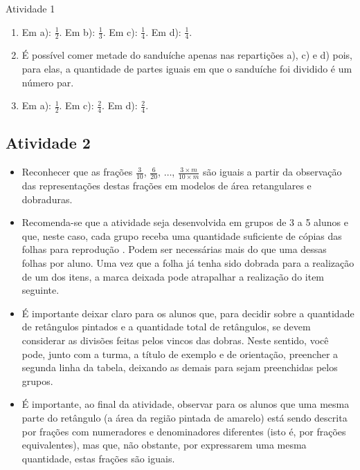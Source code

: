 \documentclass[oneside]{book}
\begin{document}
\begin{multicols}{2}
\begin{resposta*}{Atividade 1}  
\begin{enumerate} [\quad a)] %
    \item       Em a):       $\frac{1}{2}$. Em b):       $\frac{1}{3}$. Em c):   
    $\frac{1}{4}$. Em d):       $\frac{1}{4}$.
    \item       É possível comer metade do sanduíche apenas nas repartições a), 
c) e d) pois, para elas, a quantidade de partes iguais em que o sanduíche foi 
dividido é um número par.
    \item       Em a):       $\frac{1}{2}$. Em c):       $\frac{2}{4}$. Em d):   
    $\frac{2}{4}$.
\end{enumerate} %
  
\end{resposta*}





\subsection{Atividade 2}

\begin{itemize} %
    \item       Reconhecer que as frações       $\frac{3}{10}$,       
$\frac{6}{20}$,       $\ldots$,       $\frac{3 \times m}{10 \times m}$       são 
iguais a partir da observação das representações destas frações em modelos de 
área retangulares e dobraduras. 
\end{itemize} %
  
  
 
\begin{itemize} %
    \item       Recomenda-se que a atividade seja desenvolvida em grupos de 3 a 
5 alunos e que, neste caso, cada grupo receba uma quantidade suficiente de 
cópias das             folhas para reprodução      . Podem ser necessárias mais 
do que uma dessas folhas por aluno. Uma vez que a folha já tenha sido dobrada 
para a realização de um dos itens, a marca deixada pode atrapalhar a realização 
do item seguinte. 
    \item       É importante deixar claro para os alunos que, para decidir sobre 
a quantidade de retângulos pintados e a quantidade total de retângulos, se devem 
considerar as divisões feitas pelos vincos das dobras. Neste sentido, você pode, 
junto com a turma, a título de exemplo e de orientação, preencher a segunda 
linha da tabela, deixando as demais para sejam preenchidas pelos grupos.
    \item       É importante, ao final da atividade, observar para os alunos que 
uma mesma parte do retângulo (a área da região pintada de amarelo) está sendo 
descrita por frações com numeradores e denominadores diferentes (isto é, por 
frações equivalentes), mas que, não obstante, por expressarem uma mesma 
quantidade, estas frações são iguais. 
\end{itemize} %
  

\end{multicols}
\end{document}
